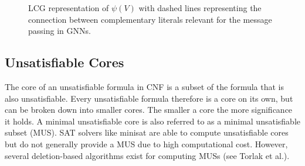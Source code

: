 \begin{figure}[h]
    \centering
    \caption{LCG representation of $\psi(V)$ with dashed lines representing the connection between complementary literals relevant for the message passing in GNNs.}
    \label{fig:lcg-sat}
\end{figure}


\subsection{Unsatisfiable Cores}
The core of an unsatisfiable formula in CNF is a subset of the formula that is also unsatisfiable. Every unsatisfiable formula therefore is a core on its own, but can be broken down into smaller cores. The smaller a core the more significance it holds. A minimal unsatisfiable core is also referred to as a minimal unsatisfiable subset (MUS). SAT solvers like minisat\cite{een2003extensible} are able to compute unsatisfiable cores but do not generally provide a MUS due to high computational cost. However, several deletion-based algorithms exist for computing MUSs (see Torlak et al.\cite{10.1007/978-3-540-68237-0_23}).